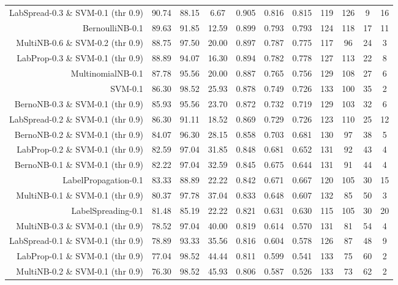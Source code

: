 \begin{table}[!htb]
\begin{tabular}{r|c|c|c|c|c|c|c|c|c|c}
LabSpread-0.3 \& SVM-0.1 (thr 0.9) & 90.74 & 88.15 & 6.67 & 0.905 & 0.816 & 0.815 & 119 & 126 & 9 & 16 \\ 
BernoulliNB-0.1 & 89.63 & 91.85 & 12.59 & 0.899 & 0.793 & 0.793 & 124 & 118 & 17 & 11 \\ 
MultiNB-0.6 \& SVM-0.2 (thr 0.9) & 88.75 & 97.50 & 20.00 & 0.897 & 0.787 & 0.775 & 117 & 96 & 24 & 3 \\ 
LabProp-0.3 \& SVM-0.1 (thr 0.9) & 88.89 & 94.07 & 16.30 & 0.894 & 0.782 & 0.778 & 127 & 113 & 22 & 8 \\ 
MultinomialNB-0.1 & 87.78 & 95.56 & 20.00 & 0.887 & 0.765 & 0.756 & 129 & 108 & 27 & 6 \\ 
SVM-0.1 & 86.30 & 98.52 & 25.93 & 0.878 & 0.749 & 0.726 & 133 & 100 & 35 & 2 \\ 
BernoNB-0.3 \& SVM-0.1 (thr 0.9) & 85.93 & 95.56 & 23.70 & 0.872 & 0.732 & 0.719 & 129 & 103 & 32 & 6 \\ 
LabSpread-0.2 \& SVM-0.1 (thr 0.9) & 86.30 & 91.11 & 18.52 & 0.869 & 0.729 & 0.726 & 123 & 110 & 25 & 12 \\ 
BernoNB-0.2 \& SVM-0.1 (thr 0.9) & 84.07 & 96.30 & 28.15 & 0.858 & 0.703 & 0.681 & 130 & 97 & 38 & 5 \\ 
LabProp-0.2 \& SVM-0.1 (thr 0.9) & 82.59 & 97.04 & 31.85 & 0.848 & 0.681 & 0.652 & 131 & 92 & 43 & 4 \\ 
BernoNB-0.1 \& SVM-0.1 (thr 0.9) & 82.22 & 97.04 & 32.59 & 0.845 & 0.675 & 0.644 & 131 & 91 & 44 & 4 \\ 
LabelPropagation-0.1 & 83.33 & 88.89 & 22.22 & 0.842 & 0.671 & 0.667 & 120 & 105 & 30 & 15 \\ 
MultiNB-0.1 \& SVM-0.1 (thr 0.9) & 80.37 & 97.78 & 37.04 & 0.833 & 0.648 & 0.607 & 132 & 85 & 50 & 3 \\ 
LabelSpreading-0.1 & 81.48 & 85.19 & 22.22 & 0.821 & 0.631 & 0.630 & 115 & 105 & 30 & 20 \\ 
MultiNB-0.3 \& SVM-0.1 (thr 0.9) & 78.52 & 97.04 & 40.00 & 0.819 & 0.614 & 0.570 & 131 & 81 & 54 & 4 \\ 
LabSpread-0.1 \& SVM-0.1 (thr 0.9) & 78.89 & 93.33 & 35.56 & 0.816 & 0.604 & 0.578 & 126 & 87 & 48 & 9 \\ 
LabProp-0.1 \& SVM-0.1 (thr 0.9) & 77.04 & 98.52 & 44.44 & 0.811 & 0.599 & 0.541 & 133 & 75 & 60 & 2 \\ 
MultiNB-0.2 \& SVM-0.1 (thr 0.9) & 76.30 & 98.52 & 45.93 & 0.806 & 0.587 & 0.526 & 133 & 73 & 62 & 2 \\ 
\hline\hline
\end{tabular}
\end{table}
